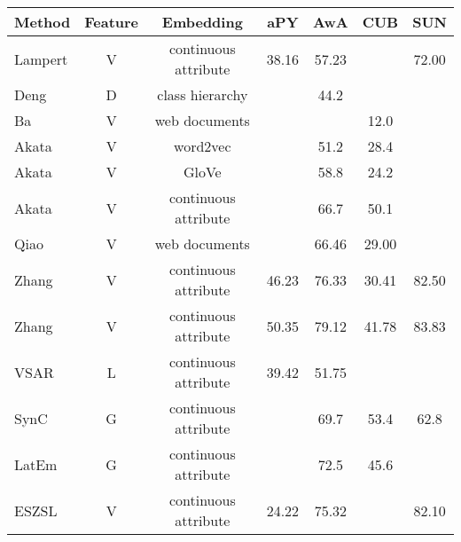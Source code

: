 \documentclass{bmvc2k}
\begin{document}
\begin{table*}[!t]
\begin{center}
\begin{tabular}{|l|c|c|c|c|c|c|}
\hline
Method &Feature &Embedding &aPY &AwA  &CUB &SUN\\
\hline\hline
Lampert \cite{Lampert14pami} & V &continuous attribute  &38.16 & 57.23 & &72.00 \\
Deng \cite{deng2014large} & D &class hierarchy  & & 44.2 &  & \\
Ba \cite{Ba2015ICCV} & V  &web documents  & &  &12.0  & \\
Akata \cite{Akata15output} &V &word2vec & & 51.2  & 28.4 & \\
Akata \cite{Akata15output} &V &GloVe & & 58.8 &  24.2 & \\
Akata \cite{Akata15output} &V &continuous attribute  & & 66.7 &  50.1 & \\
Qiao \cite{Qiao_2016_CVPR} &V &web documents & &66.46 &29.00 & \\
Zhang \cite{Zhang2015ICCV} &V &continuous attribute &46.23 &76.33 &30.41 &82.50 \\
Zhang \cite{Zhang2016CVPR} &V &continuous attribute &50.35 &79.12 &41.78 &83.83 \\
VSAR \cite{LongBMVC16} &L &continuous attribute &39.42 &51.75 & & \\
SynC \cite{SynC2016} &G & continuous attribute   & &69.7  &53.4 & 62.8  \\
LatEm \cite{LatEm2016} &G &continuous attribute &  &72.5   &45.6 & \\
ESZSL \cite{Romera2015ZSL} &V &continuous attribute &24.22 &75.32  &    &82.10 \\
\hline
\hline
%


\end{tabular}
\end{center}
\end{table*}
\end{document}
